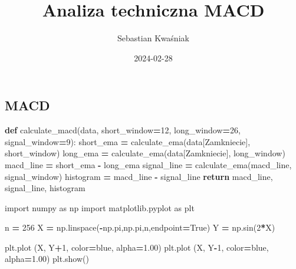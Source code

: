 \documentclass[
]{article}
\title{Analiza techniczna MACD}
\author{Sebastian Kwaśniak}
\date{2024-02-28}
\newenvironment{Shaded}{\begin{snugshade}}{\end{snugshade}}
\newcommand{\ControlFlowTok}[1]{\textcolor[rgb]{0.13,0.29,0.53}{\textbf{#1}}}
\newcommand{\DecValTok}[1]{\textcolor[rgb]{0.00,0.00,0.81}{#1}}
\newcommand{\FloatTok}[1]{\textcolor[rgb]{0.00,0.00,0.81}{#1}}
\newcommand{\ImportTok}[1]{#1}
\newcommand{\KeywordTok}[1]{\textcolor[rgb]{0.13,0.29,0.53}{\textbf{#1}}}
\newcommand{\NormalTok}[1]{#1}
\newcommand{\OperatorTok}[1]{\textcolor[rgb]{0.81,0.36,0.00}{\textbf{#1}}}
\newcommand{\StringTok}[1]{\textcolor[rgb]{0.31,0.60,0.02}{#1}}
\newcommand{\VariableTok}[1]{\textcolor[rgb]{0.00,0.00,0.00}{#1}}
\begin{document}
\maketitle

\subsection{MACD}\label{macd}

\begin{Shaded}
\begin{Highlighting}[]
\KeywordTok{def}\NormalTok{ calculate\_macd(data, short\_window}\OperatorTok{=}\DecValTok{12}\NormalTok{, long\_window}\OperatorTok{=}\DecValTok{26}\NormalTok{, signal\_window}\OperatorTok{=}\DecValTok{9}\NormalTok{):}
\NormalTok{    short\_ema }\OperatorTok{=}\NormalTok{ calculate\_ema(data[}\StringTok{\textquotesingle{}Zamkniecie\textquotesingle{}}\NormalTok{], short\_window)}
\NormalTok{    long\_ema }\OperatorTok{=}\NormalTok{ calculate\_ema(data[}\StringTok{\textquotesingle{}Zamkniecie\textquotesingle{}}\NormalTok{], long\_window)}
\NormalTok{    macd\_line }\OperatorTok{=}\NormalTok{ short\_ema }\OperatorTok{{-}}\NormalTok{ long\_ema}
\NormalTok{    signal\_line }\OperatorTok{=}\NormalTok{ calculate\_ema(macd\_line, signal\_window)}
\NormalTok{    histogram }\OperatorTok{=}\NormalTok{ macd\_line }\OperatorTok{{-}}\NormalTok{ signal\_line}
    \ControlFlowTok{return}\NormalTok{ macd\_line, signal\_line, histogram}
\end{Highlighting}
\end{Shaded}

\begin{Shaded}
\begin{Highlighting}[]
\ImportTok{import}\NormalTok{ numpy }\ImportTok{as}\NormalTok{ np}
\ImportTok{import}\NormalTok{ matplotlib.pyplot }\ImportTok{as}\NormalTok{ plt}

\NormalTok{n }\OperatorTok{=} \DecValTok{256}
\NormalTok{X }\OperatorTok{=}\NormalTok{ np.linspace(}\OperatorTok{{-}}\NormalTok{np.pi,np.pi,n,endpoint}\OperatorTok{=}\VariableTok{True}\NormalTok{)}
\NormalTok{Y }\OperatorTok{=}\NormalTok{ np.sin(}\DecValTok{2}\OperatorTok{*}\NormalTok{X)}

\NormalTok{plt.plot (X, Y}\OperatorTok{+}\DecValTok{1}\NormalTok{, color}\OperatorTok{=}\StringTok{\textquotesingle{}blue\textquotesingle{}}\NormalTok{, alpha}\OperatorTok{=}\FloatTok{1.00}\NormalTok{)}
\NormalTok{plt.plot (X, Y}\OperatorTok{{-}}\DecValTok{1}\NormalTok{, color}\OperatorTok{=}\StringTok{\textquotesingle{}blue\textquotesingle{}}\NormalTok{, alpha}\OperatorTok{=}\FloatTok{1.00}\NormalTok{)}
\NormalTok{plt.show()}
\end{Highlighting}
\end{Shaded}
\end{document}
